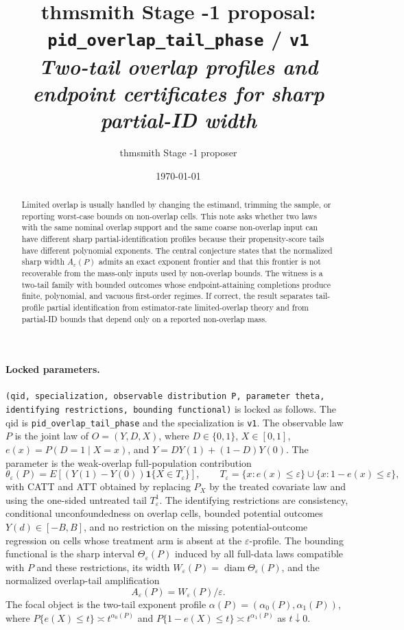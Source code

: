 \documentclass[11pt]{article}
\title{thmsmith Stage -1 proposal: \texttt{pid\_overlap\_tail\_phase} / \texttt{v1}%
  \\ \large\textit{Two-tail overlap profiles and endpoint certificates for sharp partial-ID width}}
\author{thmsmith Stage -1 proposer}
\date{\today}
\theoremstyle{definition}
\theoremstyle{plain}
\theoremstyle{remark}
\begin{document}
\maketitle


\paragraph{Locked parameters.}
\texttt{(qid, specialization, observable distribution P, parameter theta, identifying restrictions, bounding functional)}
is locked as follows. The qid is \texttt{pid\_overlap\_tail\_phase} and the specialization is
\texttt{v1}. The observable law \(P\) is the joint law of \(O=(Y,D,X)\), where
\(D\in\{0,1\}\), \(X\in[0,1]\), \(e(x)=P(D=1\mid X=x)\), and \(Y=D Y(1)+(1-D)Y(0)\).
The parameter is the weak-overlap full-population contribution
\[
\theta_\varepsilon(P)=E[(Y(1)-Y(0))\mathbf 1\{X\in T_\varepsilon\}],\qquad
T_\varepsilon=\{x:e(x)\leq \varepsilon\}\cup\{x:1-e(x)\leq \varepsilon\},
\]
with CATT and ATT obtained by replacing \(P_X\) by the treated covariate law and using
the one-sided untreated tail \(T_\varepsilon^1\). The identifying restrictions are consistency, conditional
unconfoundedness on overlap cells, bounded potential outcomes \(Y(d)\in[-B,B]\), and no
restriction on the missing potential-outcome regression on cells whose treatment arm is
absent at the \(\varepsilon\)-profile. The bounding functional is the sharp interval
\(\Theta_\varepsilon(P)\) induced by all full-data laws compatible with \(P\) and these
restrictions, its width \(W_\varepsilon(P)=\operatorname{diam}\Theta_\varepsilon(P)\), and
the normalized overlap-tail amplification
\[
A_\varepsilon(P)=W_\varepsilon(P)/\varepsilon .
\]
The focal object is the two-tail exponent profile
\(\alpha(P)=(\alpha_0(P),\alpha_1(P))\), where
\(P\{e(X)\leq t\}\asymp t^{\alpha_0(P)}\) and
\(P\{1-e(X)\leq t\}\asymp t^{\alpha_1(P)}\) as \(t\downarrow0\).

\begin{abstract}
Limited overlap is usually handled by changing the estimand, trimming the sample, or
reporting worst-case bounds on non-overlap cells. This note asks whether two laws with the
same nominal overlap support and the same coarse non-overlap input can have different
sharp partial-identification profiles because their propensity-score tails have different
polynomial exponents. The central conjecture states that the normalized sharp width
\(A_\varepsilon(P)\) admits an exact exponent frontier and that this frontier is not
recoverable from the mass-only inputs used by non-overlap bounds. The witness is a
two-tail family with bounded outcomes whose endpoint-attaining completions produce
finite, polynomial, and vacuous first-order regimes. If correct, the result separates
tail-profile partial identification from estimator-rate limited-overlap theory and from
partial-ID bounds that depend only on a reported non-overlap mass.
\end{abstract}
\end{document}
